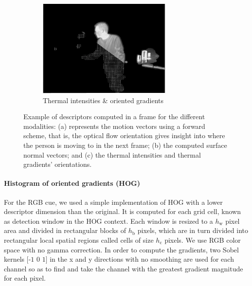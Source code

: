 \documentclass[10pt,twocolumn,letterpaper]{article}
\begin{document}
\begin{figure}[ht]
        \begin{subfigure}[b]{0.33\textwidth}
                \includegraphics[width=\textwidth]{hihog.png}
                \caption{Thermal intensities \& oriented gradients}
                \label{fig:thermals}
        \end{subfigure}	
        \caption{Example of descriptors computed in a frame for the different modalities: (a) represents the motion vectors using a forward scheme, that is, the optical flow orientation gives insight into where the person is moving to in the next frame; (b) the computed surface normal vectors; and (c) the thermal intensities and thermal gradients' orientations. }\label{fig:descriptors}
\end{figure}

\paragraph{Histogram of oriented gradients (HOG)}

For the RGB cue, we used a simple implementation of HOG \cite{dalal2005histograms} with a lower descriptor dimension than the original. It is computed for each grid cell, known as detection window in the HOG context. Each window is resized to a $h_\text{w}$ pixel area and divided in rectangular blocks of $h_\text{b}$ pixels, which are in turn divided into rectangular local spatial regions called cells of size $h_\text{c}$ pixels. We use RGB color space with no gamma correction. In order to compute the gradients, two Sobel kernels $\mbox{[-1 0 1]}$ in the x and y directions with no smoothing are used for each channel so as to find and take the channel with the greatest gradient magnitude for each pixel. 
\end{document}
